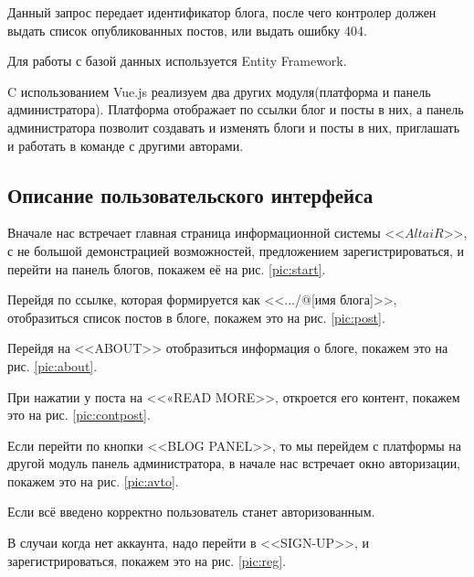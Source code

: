 
Данный запрос передает идентификатор блога, после чего контролер должен выдать список опубликованных постов, или выдать ошибку 404.

Для работы с базой данных используется Entity Framework.

C использованием Vue.js реализуем два других модуля(платформа и панель администратора). Платформа отображает по ссылки блог и посты в них, а панель администратора позволит создавать и изменять блоги и посты в них, приглашать и работать в команде с другими авторами. 


\subsection{Описание пользовательского интерфейса}

Вначале нас встречает главная страница информационной системы <<$AltaiR$>>, с не большой демонстрацией возможностей, предложением зарегистрироваться, и перейти на панель блогов, покажем её на рис. \ref{pic:start}.


\pagebreak
Перейдя по ссылке, которая формируется как <<.../@[имя блога]>>, отобразиться список постов в блоге, покажем это на рис. \ref{pic:post}.



Перейдя на <<ABOUT>> отобразиться информация о блоге, покажем это на рис. \ref{pic:about}.


\pagebreak
При нажатии у поста на <<«READ MORE>>, откроется его контент, покажем это на рис. \ref{pic:contpost}.



Если перейти по кнопки <<BLOG PANEL>>, то мы перейдем с платформы на другой модуль панель администратора, в начале нас встречает окно авторизации, покажем это на рис. \ref{pic:avto}.


Если всё введено корректно пользователь станет авторизованным.

\pagebreak
В случаи когда нет аккаунта, надо перейти в <<SIGN-UP>>, и зарегистрироваться, покажем это на рис. \ref{pic:reg}.

